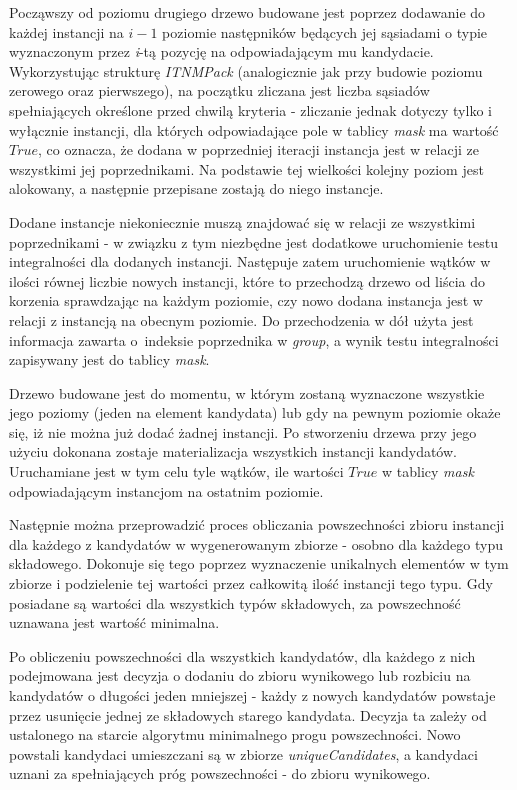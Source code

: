 \documentclass[12pt]{article}
\begin{document}
Począwszy od poziomu drugiego drzewo budowane jest poprzez dodawanie do każdej instancji na $ i - 1 $ poziomie następników będących jej sąsiadami o typie wyznaczonym przez \textit{i}-tą pozycję na odpowiadającym mu kandydacie. Wykorzystując strukturę \textit{ITNMPack} (analogicznie jak przy budowie poziomu zerowego oraz pierwszego), na początku zliczana jest liczba sąsiadów spełniających określone przed chwilą kryteria - zliczanie jednak dotyczy tylko i wyłącznie instancji, dla których odpowiadające pole w tablicy \textit{mask} ma wartość $ True $, co oznacza, że dodana w poprzedniej iteracji instancja jest w relacji ze wszystkimi jej poprzednikami. Na podstawie tej wielkości kolejny poziom jest alokowany, a następnie przepisane zostają do niego instancje.

Dodane instancje niekoniecznie muszą znajdować się w relacji ze wszystkimi poprzednikami - w związku z tym niezbędne jest dodatkowe uruchomienie testu integralności dla dodanych instancji. Następuje zatem uruchomienie wątków w ilości równej liczbie nowych instancji, które to przechodzą drzewo od liścia do korzenia sprawdzając na każdym poziomie, czy nowo dodana instancja jest w relacji z instancją na obecnym poziomie. Do przechodzenia w dół użyta jest informacja zawarta o~indeksie poprzednika w \textit{group}, a wynik testu integralności zapisywany jest do tablicy \textit{mask}.

Drzewo budowane jest do momentu, w którym zostaną wyznaczone wszystkie jego poziomy (jeden na element kandydata) lub gdy na pewnym poziomie okaże się, iż nie można już dodać żadnej instancji. Po stworzeniu drzewa przy jego użyciu dokonana zostaje materializacja wszystkich instancji kandydatów. Uruchamiane jest w tym celu tyle wątków, ile wartości $ True $ w tablicy \textit{mask} odpowiadającym instancjom na ostatnim poziomie. 

Następnie można przeprowadzić proces obliczania powszechności zbioru instancji dla każdego z kandydatów w wygenerowanym zbiorze - osobno dla każdego typu składowego. Dokonuje się tego poprzez wyznaczenie unikalnych elementów w tym zbiorze i podzielenie tej wartości przez całkowitą ilość instancji tego typu. Gdy posiadane są wartości dla wszystkich typów składowych, za powszechność uznawana jest wartość minimalna.

Po obliczeniu powszechności dla wszystkich kandydatów, dla każdego z nich podejmowana jest decyzja o dodaniu do zbioru wynikowego lub rozbiciu na kandydatów o długości jeden mniejszej - każdy z nowych kandydatów powstaje przez usunięcie jednej ze składowych starego kandydata. Decyzja ta zależy od ustalonego na starcie algorytmu minimalnego progu powszechności. Nowo powstali kandydaci umieszczani są w zbiorze \textit{uniqueCandidates}, a kandydaci uznani za spełniających próg powszechności - do zbioru wynikowego.
\end{document}
